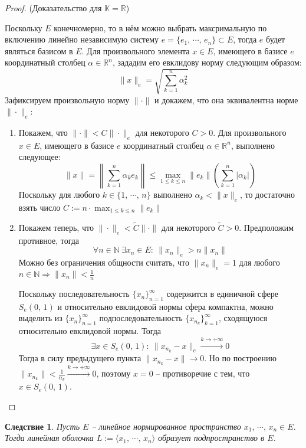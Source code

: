 \documentclass[a4paper,12pt]{article}
\renewcommand{\leq}{\ensuremath{\leqslant}}
\theoremstyle{plain}
\newtheorem*{corollary}{Следствие}
\theoremstyle{definition}
\theoremstyle{remark}
\begin{document}
\begin{proof}
	(Доказательство для $\mathbb{K} = \mathbb{R}$)

	Поскольку $E$ конечномерно, то в нём можно выбрать максримальную по включению линейно независимую систему $e = \{e_1,\,\cdots,\,e_n\} \subset E$, тогда $e$ будет являться базисом в $E$. Для произвольного элемента $x \in E$, имеющего в базисе $e$ координатный столбец $\alpha \in \mathbb{R}^n$, зададим его евклидову норму следующим образом:
	\[
		\|x\|_e = \sqrt{\sum_{k = 1}^n \alpha_k^2}
	\]
	Зафиксируем произвольную норму $\|\cdot\|$ и докажем, что она эквивалентна норме $\|\cdot\|_e$:
	\begin{enumerate}
		\item Покажем, что $\|\cdot\| < C\|\cdot\|_e$ для некоторого $C > 0$. Для произвольного $x \in E$, имеющего в базисе $e$ координатный столбец $\alpha \in \mathbb{R}^n$, выполнено следующее:
		      \[
			      \|x\| = \left\|\sum_{k = 1}^n \alpha_ke_k\right\| \leq \max_{1 \leq k \leq n}\|e_k\| \left(\sum_{k = 1}^n \vert \alpha_k\vert\right)
		      \]
		      Поскольку для любого $k \in \{1,\, \cdots,\,n\}$ выполнено $\alpha_k < \|x\|_e$, то достаточно взять число $C := n\cdot\max_{1\leq k\leq n}\|e_k\|$
		\item Покажем теперь, что $\|\cdot\|_e < \tilde{C}\|\cdot\|$ для некоторого $\tilde{C} > 0$. Предположим противное, тогда
		      \[
			      \forall n \in \mathbb{N} \: \exists x_n \in E :\: \|x_n\|_e > n\|x_n\|
		      \]
		      Можно без ограничения общности считать, что $\|x_n\|_e = 1$ для любого $n \in \mathbb{N} \Rightarrow \|x_n\| < \frac{1}{n}$

		      Поскольку последовательность $\{x_n\}_{n = 1}^\infty$ содержится в единичной сфере $S_e(0,\,1)$ и относительно евклидовой нормы сфера компактна, можно выделить из $\{x_n\}_{n = 1}^\infty$ подпоследовательность $\{x_{n_k}\}_{k = 1}^\infty$, сходящуюся относительно евклидовой нормы. Тогда
		      \[
			      \exists x \in S_e(0,\,1) :\: \|x_{n_k} - x\|_e \overset{k \to +\infty}{\to} 0
		      \]
		      Тогда в силу предыдущего пункта $\|x_{n_k} - x\| \to 0$. Но по построению $\|x_{n_k}\| < \frac{1}{n_k} \overset{k \to +\infty}{\to} 0$, поэтому $x = 0$ -- противоречие с тем, что $x \in S_e(0,\,1)$.
	\end{enumerate}
\end{proof}

\begin{corollary}
	Пусть $E$ -- линейное нормированное пространство $x_1,\,\cdots,\,x_n \in E$. Тогда линейная оболочка $L := \langle x_1,\,\cdots,\, x_n\rangle$ образует подпространство в $E$.
\end{corollary}
\end{document}
